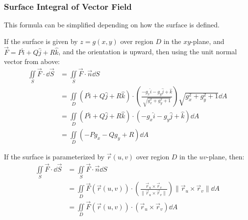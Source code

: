 \subsubsection{Surface Integral of Vector Field}



This formula can be simplified depending on how the surface is defined.

If the surface is given by $z = g(x,y)$ over region $D$ in the $xy$-plane, and $\vec{F} = P\hat{i} + Q\hat{j} + R\hat{k}$, and the orientation is upward, then using the unit normal vector from above:
\begin{align*}
    \iint \limits_{S} \vec{F} \cdot \dd{\vec{S}} &= \iint \limits_{S} \vec{F} \cdot \vec{n} \dd{S} \\
                                                 &= \iint \limits_{D} (P\hat{i} + Q\hat{j} + R\hat{k}) \cdot \left( \frac{-g_x\hat{i} - g_y\hat{j} + \hat{k}}{\sqrt{g_x^2 + g_y^2 + 1}} \right) \sqrt{g_x^2 + g_y^2 + 1} \dd{A} \\
                                                 &= \iint \limits_{D} (P\hat{i} + Q\hat{j} + R\hat{k}) \cdot (-g_x\hat{i} - g_y\hat{j} + \hat{k}) \dd{A} \\
                                                 &= \iint \limits_{D} (-Pg_x - Qg_y + R) \dd{A}
\end{align*}


If the surface is parameterized by $\vec{r}(u,v)$ over region $D$ in the $uv$-plane, then:
\begin{align*}
    \iint \limits_S \vec{F} \cdot \dd{\vec{S}} &= \iint \limits_S \vec{F} \cdot \vec{n} \dd{S} \\
                                                 &= \iint \limits_D \vec{F}(\vec{r}(u,v)) \cdot \left( \frac{\vec{r}_u \times \vec{r}_v}{\lVert \vec{r}_u \times \vec{r}_v \rVert} \right) \lVert \vec{r}_u \times \vec{r}_v \rVert \dd{A} \\
                                                 &= \iint \limits_D \vec{F}(\vec{r}(u,v)) \cdot (\vec{r}_u \times \vec{r}_v) \dd{A}
\end{align*}

